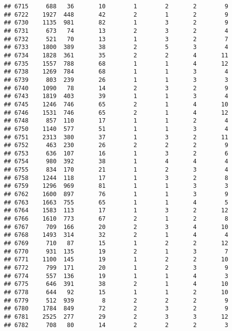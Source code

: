 \documentclass[]{article}
\begin{document}
\begin{verbatim}
## 6715     688   36       10        1        2       2        9
## 6722    1927  448       42        2        1       2        9
## 6730    1135  981       82        1        3       2        9
## 6731     673   74       13        2        3       2        4
## 6732     521   70       13        1        3       2        7
## 6733    1800  389       38        2        5       3        4
## 6734    1828  361       35        2        2       4       11
## 6735    1557  788       68        1        1       4       12
## 6738    1269  784       68        1        1       3        4
## 6739     803  239       26        1        1       3        3
## 6740    1090   78       14        2        3       2        9
## 6743    1819  403       39        1        1       3        4
## 6745    1246  746       65        2        1       4       10
## 6746    1531  746       65        2        1       4       12
## 6748     857  110       17        1        1       2        4
## 6750    1140  577       51        1        1       3        4
## 6751    2313  380       37        1        3       2       11
## 6752     463  230       26        2        2       2        9
## 6753     636  107       16        1        3       2        6
## 6754     980  392       38        1        4       4        4
## 6755     834  170       21        1        2       3        4
## 6758    1244  118       17        1        3       2        8
## 6759    1296  969       81        1        1       3        3
## 6762    1600  897       76        1        1       3        9
## 6763    1663  755       65        1        1       4        5
## 6764    1583  113       17        1        3       2       12
## 6766    1610  773       67        2        1       2        8
## 6767     709  166       20        2        3       4       10
## 6768    1493  314       32        2        1       4        4
## 6769     710   87       15        1        2       2       12
## 6770     931  135       19        2        1       3        7
## 6771    1100  145       19        1        2       2       10
## 6772     799  171       20        1        2       3        9
## 6774     557  136       19        1        1       4        3
## 6775     646  391       38        2        1       4       10
## 6778     644   92       15        1        1       2       10
## 6779     512  939        8        2        2       2        9
## 6780    1784  849       72        2        3       2        9
## 6781    2525  277       29        2        3       3       12
## 6782     708   80       14        2        2       2        3

\end{verbatim}
\end{document}
